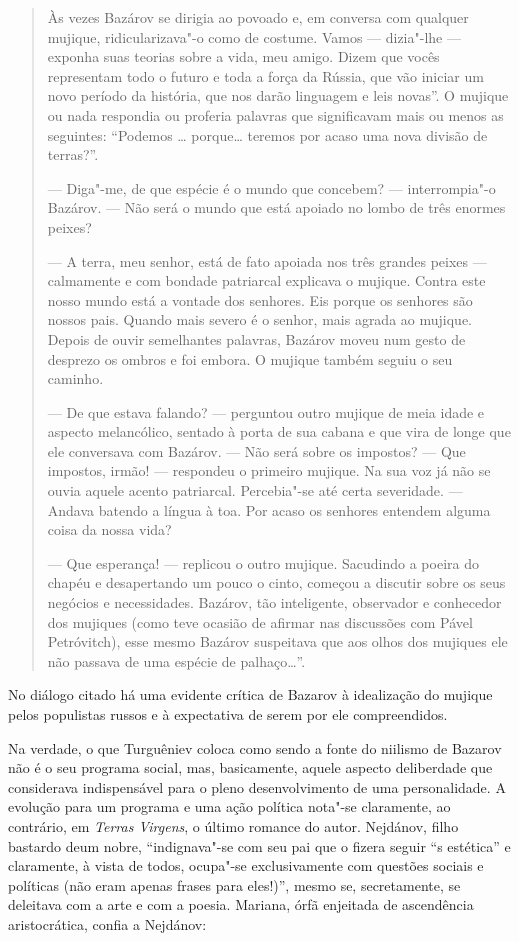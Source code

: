 \begin{quote}
Às vezes Bazárov se dirigia ao povoado e, em conversa com qualquer
mujique, ridicularizava"-o como de costume. Vamos --- dizia"-lhe --- exponha
suas teorias sobre a vida, meu amigo. Dizem que vocês representam todo o
futuro e toda a força da Rússia, que vão iniciar um novo período da
história, que nos darão linguagem e leis novas''. O mujique ou nada
respondia ou proferia palavras que significavam mais ou menos as
seguintes: ``Podemos \ldots{} porque\ldots{} teremos por acaso uma nova divisão
de terras?''.

--- Diga"-me, de que espécie é o mundo que concebem? --- interrompia"-o
Bazárov. --- Não será o mundo que está apoiado no lombo de três enormes
peixes?

--- A terra, meu senhor, está de fato apoiada nos três grandes peixes ---
calmamente e com bondade patriarcal explicava o mujique. Contra este
nosso mundo está a vontade dos senhores. Eis porque os senhores são
nossos pais. Quando mais severo é o senhor, mais agrada ao mujique.
Depois de ouvir semelhantes palavras, Bazárov moveu num gesto de
desprezo os ombros e foi embora. O mujique também seguiu o seu caminho.

--- De que estava falando? --- perguntou outro mujique de meia idade e
aspecto melancólico, sentado à porta de sua cabana e que vira de longe
que ele conversava com Bazárov. --- Não será sobre os impostos? --- Que
impostos, irmão! --- respondeu o primeiro mujique. Na sua voz já não se
ouvia aquele acento patriarcal. Percebia"-se até certa severidade. ---
Andava batendo a língua à toa. Por acaso os senhores entendem alguma
coisa da nossa vida?

--- Que esperança! --- replicou o outro mujique. Sacudindo a poeira do
chapéu e desapertando um pouco o cinto, começou a discutir sobre os seus
negócios e necessidades. Bazárov, tão inteligente, observador e
conhecedor dos mujiques (como teve ocasião de afirmar nas discussões com
Pável Petróvitch), esse mesmo Bazárov suspeitava que aos olhos dos
mujiques ele não passava de uma espécie de palhaço\ldots{}''.
\end{quote}

No diálogo citado há uma evidente crítica de Bazarov à idealização do
mujique pelos populistas russos e à expectativa de serem por ele
compreendidos.

Na verdade, o que Turguêniev coloca como sendo a fonte do niilismo de
Bazarov não é o seu programa social, mas, basicamente, aquele aspecto
deliberdade que considerava indispensável para o pleno desenvolvimento
de uma personalidade. A evolução para um programa e uma ação política
nota"-se claramente, ao contrário, em \emph{Terras Virgens}, o último
romance do autor. Nejdánov, filho bastardo deum nobre, ``indignava"-se
com seu pai que o fizera seguir ``s estética'' e claramente, à vista de
todos, ocupa"-se exclusivamente com questões sociais e políticas (não
eram apenas frases para eles!)'', mesmo se, secretamente, se deleitava
com a arte e com a poesia. Mariana, órfã enjeitada de ascendência
aristocrática, confia a Nejdánov:

